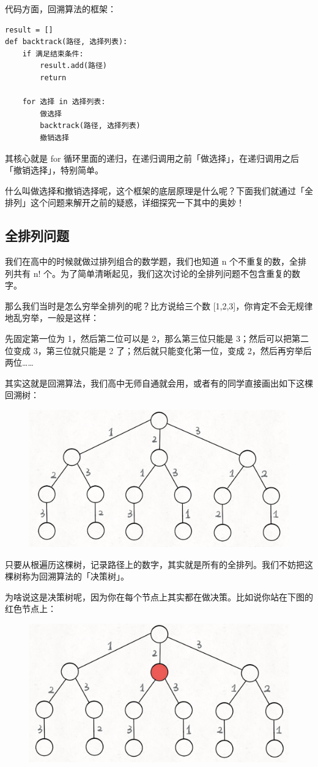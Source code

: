 \documentclass[12pt]{article}
\begin{document}
代码方面，回溯算法的框架：
\begin{lstlisting}
result = []
def backtrack(路径, 选择列表):
    if 满足结束条件:
        result.add(路径)
        return
    
    for 选择 in 选择列表:
        做选择
        backtrack(路径, 选择列表)
        撤销选择
\end{lstlisting}

其核心就是 for 循环里面的递归，在递归调用之前「做选择」，在递归调用之后「撤销选择」，特别简单。

什么叫做选择和撤销选择呢，这个框架的底层原理是什么呢？下面我们就通过「全排列」这个问题来解开之前的疑惑，详细探究一下其中的奥妙！

\subsection{全排列问题}
我们在高中的时候就做过排列组合的数学题，我们也知道 n 个不重复的数，全排列共有 n! 个。为了简单清晰起见，我们这次讨论的全排列问题不包含重复的数字。

那么我们当时是怎么穷举全排列的呢？比方说给三个数 [1,2,3]，你肯定不会无规律地乱穷举，一般是这样：

先固定第一位为 1，然后第二位可以是 2，那么第三位只能是 3；然后可以把第二位变成 3，第三位就只能是 2 了；然后就只能变化第一位，变成 2，然后再穷举后两位……

其实这就是回溯算法，我们高中无师自通就会用，或者有的同学直接画出如下这棵回溯树：
\begin{figure}[H]
    \centering
    \includegraphics[width=.5\textwidth]{fig/Backtrack_1.png}
\end{figure}

只要从根遍历这棵树，记录路径上的数字，其实就是所有的全排列。我们不妨把这棵树称为回溯算法的「决策树」。

为啥说这是决策树呢，因为你在每个节点上其实都在做决策。比如说你站在下图的红色节点上：
\begin{figure}[H]
    \centering
    \includegraphics[width=.5\textwidth]{fig/Backtrack_2.png}
\end{figure}
\end{document}
